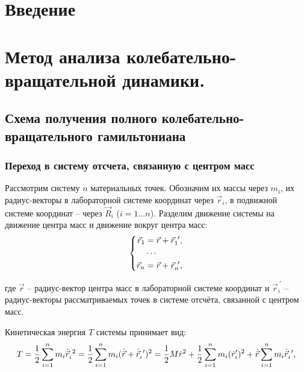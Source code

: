 \section{Введение}

\section{Метод анализа колебательно-вращательной динамики.}
\subsection{Схема получения полного колебательно-вращательного гамильтониана}
\subsubsection{Переход в систему отсчета, связанную с центром масс}

\hspace{0.48cm} Рассмотрим систему $n$ материальных точек. Обозначим их массы через $m_i$, их радиус-векторы в лабораторной системе координат через $\vec{r}_i$, в подвижной системе координат -- через $\vec{R}_i$ ($i = 1 \dots n$). Разделим движение системы на движение центра масс и движение вокруг центра масс:
\vspace*{-0.1cm}
\begin{gather}
\left\{
\begin{aligned}
\vec{r}_1 &= \vec{r} + \vec{r}_1^{\ \prime}, \\
&\cdots \\
\vec{r}_n &= \vec{r} + \vec{r}_n^{\ \prime},
\end{aligned}
\right. \notag
\end{gather}

\hspace*{-0.75cm} где $\vec{r}$ -- радиус-вектор центра масс в лабораторной системе координат и $\vec{r}_i^{\ \prime}$ -- радиус-векторы рассматриваемых точек в системе отсчёта, связанной с центром масс.

Кинетическая энергия $T$ системы принимает вид: 
\vspace*{-0.1cm}
\begin{gather}
T = \frac{1}{2} \sum_{i=1}^{n} m_i \dot{\vec{r}}_i^{\ 2} = \frac{1}{2} \sum_{i=1}^{n} m_i (\dot{\vec{r}} + \dot{\vec{r}}_i^{\ \prime})^2  = \frac{1}{2} M \dot{r}^2 + \frac{1}{2} \sum_{i=1}^{n} m_i ( \dot{r}_i^\prime)^2 + \dot{\vec{r}} \sum_{i=1}^{n} m_i \dot{\vec{r}}_i^{\ \prime}, \notag
\end{gather}

